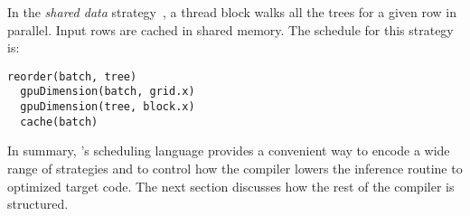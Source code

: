 In the \emph{shared data} strategy~\cite{Tahoe}, a thread block walks all the trees 
for a given row in parallel. Input rows are cached in shared memory.
The schedule for this strategy is:
\begin{lstlisting}[style=c++]
  reorder(batch, tree)
  gpuDimension(batch, grid.x)
  gpuDimension(tree, block.x)
  cache(batch)
\end{lstlisting}
  



In summary, \Treebeard{}'s scheduling language provides a convenient way to
encode a wide range of strategies and to control how the compiler lowers 
the inference routine to optimized target code. The next section 
discusses how the rest of the compiler is structured. 